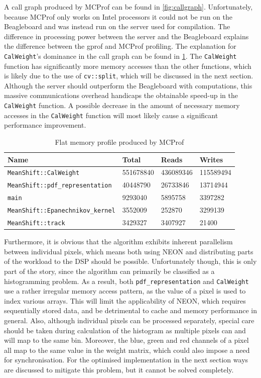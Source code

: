 \documentclass[final]{article}
\begin{document}
A call graph produced by MCProf can be found in \cref{fig:callgraph}. Unfortunately, because MCProf only works on Intel processors it could not be run on the Beagleboard and was instead run on the server used for compilation. The difference in processing power between the server and the Beagleboard explains the difference between the gprof and MCProf profiling. The explanation for \texttt{CalWeight}'s dominance in the call graph can be found in \cref{tab:memprofile}. The \texttt{CalWeight} function has significantly more memory accesses than the other functions, which is likely due to the use of \texttt{cv::split}, which will be discussed in the next section. Although the server should outperform the Beagleboard with computations, this massive communications overhead handicaps the obtainable speed-up in the \texttt{CalWeight} function. A possible decrease in the amount of necessary memory accesses in the \texttt{CalWeight} function will most likely cause a significant performance improvement.

\begin{table}[H]
\centering
\caption{Flat memory profile produced by MCProf}
\label{tab:memprofile}
\begin{tabular}{llll}
\toprule
\textbf{Name} & \textbf{Total} & \textbf{Reads} & \textbf{Writes}\\
\midrule
\texttt{MeanShift::CalWeight}   &  551678840  &   436089346   &  115589494\\
\texttt{MeanShift::pdf\_representation}    &  40448790  &    26733846   &   13714944\\
\texttt{main}   &    9293040   &    5895758    &  3397282\\
\texttt{MeanShift::Epanechnikov\_kernel}    &   3552009       & 252870  &     3299139\\
\texttt{MeanShift::track}   &    3429327   &    3407927      &   21400\\
\bottomrule
\end{tabular}
\end{table}

Furthermore, it is obvious that the algorithm exhibits inherent parallelism between individual pixels, which means both using NEON and distributing parts of the workload to the DSP should be possible.
Unfortunately though, this is only part of the story, since the algorithm can primarily be classified as a histogramming problem.
As a result, both \texttt{pdf\_representation} and \texttt{CalWeight} use a rather irregular memory access pattern, as the value of a pixel is used to index various arrays. This will limit the applicability of NEON, which requires sequentially stored data, and be detrimental to cache and memory performance in general.
Also, although individual pixels can be processed separately, special care should be taken during calculation of the histogram as multiple pixels can and will map to the same bin.
Moreover, the blue, green and red channels of a pixel all map to the same value in the weight matrix, which could also impose a need for synchronisation.
For the optimised implementation in the next section ways are discussed to mitigate this problem, but it cannot be solved completely.
\end{document}
